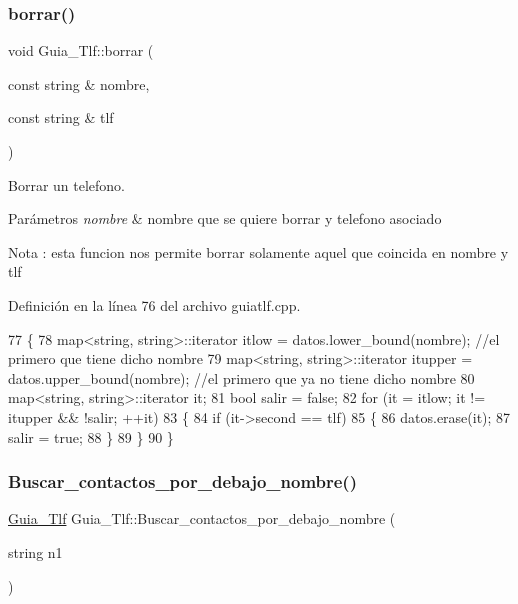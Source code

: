 \subsubsection{\texorpdfstring{borrar()}{borrar()}\hspace{0.1cm}{\footnotesize\ttfamily [2/2]}}
{\footnotesize\ttfamily void Guia\+\_\+\+Tlf\+::borrar (\begin{DoxyParamCaption}\item[{const string \&}]{nombre,  }\item[{const string \&}]{tlf }\end{DoxyParamCaption})}



Borrar un telefono. 


\begin{DoxyParams}{Parámetros}
{\em nombre} & nombre que se quiere borrar y telefono asociado \\
\hline
\end{DoxyParams}
\begin{DoxyNote}{Nota}
\+: esta funcion nos permite borrar solamente aquel que coincida en nombre y tlf 
\end{DoxyNote}


Definición en la línea 76 del archivo guiatlf.\+cpp.


\begin{DoxyCode}
77 \{
78     map<string, string>::iterator itlow = datos.lower\_bound(nombre);   \textcolor{comment}{//el primero que tiene dicho nombre}
79     map<string, string>::iterator itupper = datos.upper\_bound(nombre); \textcolor{comment}{//el primero que ya no tiene dicho
       nombre}
80     map<string, string>::iterator it;
81     \textcolor{keywordtype}{bool} salir = \textcolor{keyword}{false};
82     \textcolor{keywordflow}{for} (it = itlow; it != itupper && !salir; ++it)
83     \{
84         \textcolor{keywordflow}{if} (it->second == tlf)
85         \{
86             datos.erase(it);
87             salir = \textcolor{keyword}{true};
88         \}
89     \}
90 \}
\end{DoxyCode}
\mbox{\label{classGuia__Tlf_ab6b614acc6421415f8ac37b473855243}} 
\subsubsection{\texorpdfstring{Buscar\+\_\+contactos\+\_\+por\+\_\+debajo\+\_\+nombre()}{Buscar\_contactos\_por\_debajo\_nombre()}}
{\footnotesize\ttfamily \hyperlink{classGuia__Tlf}{Guia\+\_\+\+Tlf} Guia\+\_\+\+Tlf\+::\+Buscar\+\_\+contactos\+\_\+por\+\_\+debajo\+\_\+nombre (\begin{DoxyParamCaption}\item[{string}]{n1 }\end{DoxyParamCaption})}



